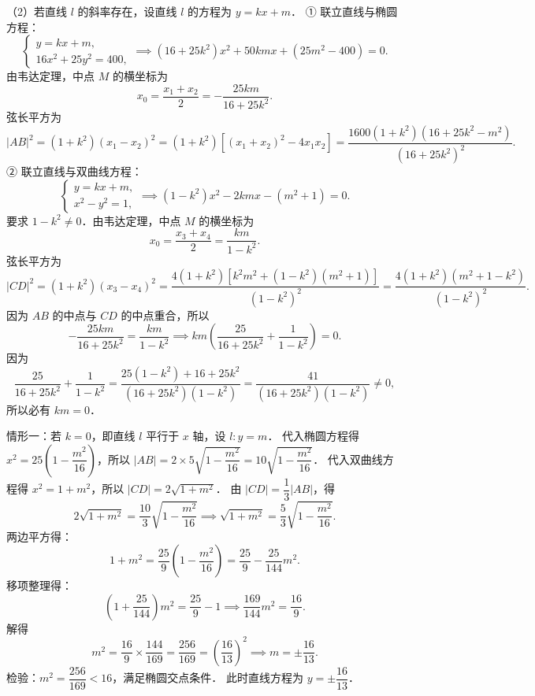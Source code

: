 \begin{answer}
（2）若直线 $l$ 的斜率存在，设直线 $l$ 的方程为 $y = kx + m$．
① 联立直线与椭圆方程：
\nopagebreak[4]
\[
\begin{cases}
y = kx + m, \\
16x^2 + 25y^2 = 400,
\end{cases}
\implies (16 + 25k^2)x^2 + 50kmx + (25m^2 - 400) = 0.
\]
由韦达定理，中点 $M$ 的横坐标为
\nopagebreak[4]
\[
x_0 = \dfrac{x_1 + x_2}{2} = -\dfrac{25km}{16 + 25k^2}.
\]
弦长平方为
\nopagebreak[4]
\[
|AB|^2 = (1 + k^2)(x_1 - x_2)^2 = (1 + k^2)\left[(x_1 + x_2)^2 - 4x_1 x_2\right] = \dfrac{1600(1 + k^2)(16 + 25k^2 - m^2)}{(16 + 25k^2)^2}.
\]
② 联立直线与双曲线方程：
\nopagebreak[4]
\[
\begin{cases}
y = kx + m, \\
x^2 - y^2 = 1,
\end{cases}
\implies (1 - k^2)x^2 - 2kmx - (m^2 + 1) = 0.
\]
要求 $1 - k^2 \neq 0$．由韦达定理，中点 $M$ 的横坐标为
\nopagebreak[4]
\[
x_0 = \dfrac{x_3 + x_4}{2} = \dfrac{km}{1 - k^2}.
\]
弦长平方为
\nopagebreak[4]
\[
|CD|^2 = (1 + k^2)(x_3 - x_4)^2 = \dfrac{4(1 + k^2)[k^2 m^2 + (1 - k^2)(m^2 + 1)]}{(1 - k^2)^2} = \dfrac{4(1 + k^2)(m^2 + 1 - k^2)}{(1 - k^2)^2}.
\]
因为 $AB$ 的中点与 $CD$ 的中点重合，所以
\nopagebreak[4]
\[
-\dfrac{25km}{16 + 25k^2} = \dfrac{km}{1 - k^2} \implies km\left(\dfrac{25}{16 + 25k^2} + \dfrac{1}{1 - k^2}\right) = 0.
\]
因为
\nopagebreak[4]
\[
\dfrac{25}{16 + 25k^2} + \dfrac{1}{1 - k^2} = \dfrac{25(1 - k^2) + 16 + 25k^2}{(16 + 25k^2)(1 - k^2)} = \dfrac{41}{(16 + 25k^2)(1 - k^2)} \neq 0,
\]
所以必有 $km = 0$．

情形一：若 $k = 0$，即直线 $l$ 平行于 $x$ 轴，设 $l: y = m$．
代入椭圆方程得 $x^2 = 25\left(1 - \dfrac{m^2}{16}\right)$，所以 $|AB| = 2 \times 5\sqrt{1 - \dfrac{m^2}{16}} = 10\sqrt{1 - \dfrac{m^2}{16}}$．
代入双曲线方程得 $x^2 = 1 + m^2$，所以 $|CD| = 2\sqrt{1 + m^2}$．
由 $|CD| = \dfrac{1}{3}|AB|$，得
\nopagebreak[4]
\[
2\sqrt{1 + m^2} = \dfrac{10}{3}\sqrt{1 - \dfrac{m^2}{16}} \implies \sqrt{1 + m^2} = \dfrac{5}{3}\sqrt{1 - \dfrac{m^2}{16}}.
\]
两边平方得：
\nopagebreak[4]
\[
1 + m^2 = \dfrac{25}{9}\left(1 - \dfrac{m^2}{16}\right) = \dfrac{25}{9} - \dfrac{25}{144}m^2.
\]
移项整理得：
\nopagebreak[4]
\[
\left(1 + \dfrac{25}{144}\right)m^2 = \dfrac{25}{9} - 1 \implies \dfrac{169}{144}m^2 = \dfrac{16}{9}.
\]
解得
\nopagebreak[4]
\[
m^2 = \dfrac{16}{9} \times \dfrac{144}{169} = \dfrac{256}{169} = \left(\dfrac{16}{13}\right)^2 \implies m = \pm \dfrac{16}{13}.
\]
检验：$m^2 = \dfrac{256}{169} < 16$，满足椭圆交点条件．
此时直线方程为 $y = \pm \dfrac{16}{13}$．


\end{answer}
